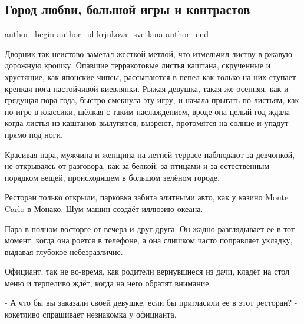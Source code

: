  
 
 
 
 
 
\subsection{Город любви, большой игры и контрастов}
\label{sec:16_09_2021.fb.krjukova_svetlana.1.gorod_ljubvi_igry_kontrastov}
 
\ifcmt
 author_begin
   author_id krjukova_svetlana
 author_end
\fi

Дворник так неистово заметал жесткой метлой, что измельчил листву в ржавую
дорожную крошку. Опавшие терракотовые листья каштана, скрученные и хрустящие,
как японские чипсы, рассыпаются в пепел как только на них ступает крепкая нога
настойчивой киевлянки. Рыжая девушка, такая же осенняя, как и грядущая пора
года, быстро смекнула эту игру, и начала прыгать по листьям, как по игре в
классики, щёлкая с таким наслаждением, вроде она целый год ждала когда листья
из каштанов вылупятся, вызреют, протомятся на солнце и упадут прямо под ноги. 

Красивая пара, мужчина и женщина на летней террасе наблюдают за девчонкой, не
открываясь от разговора, как за белкой, за птицами и за естественным порядком
вещей, происходящем в большом зелёном городе. 

Ресторан только открыли, парковка забита элитными авто, как у казино Monte
Carlo в Монако. Шум машин создаёт иллюзию океана. 

Пара в полном восторге от вечера и друг друга. Он жадно разглядывает ее в тот
момент, когда она роется в телефоне, а она слишком часто поправляет укладку,
выдавая глубокое небезразличие. 

Официант, так не во-время, как родители вернувшиеся из дачи, кладёт на стол
меню и терпеливо ждёт, когда на него обратят внимание.

- А что бы вы заказали своей девушке, если бы пригласили ее в этот ресторан? -
кокетливо спрашивает незнакомка у официанта. 

